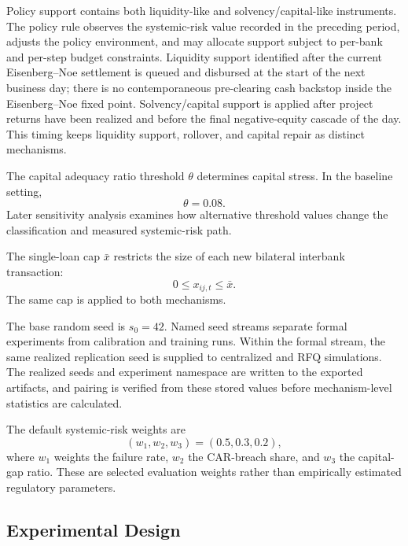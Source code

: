 Policy support contains both liquidity-like and solvency/capital-like
instruments. The policy rule observes the systemic-risk value recorded in
the preceding period, adjusts the policy environment, and may allocate
support subject to per-bank and per-step budget constraints. Liquidity
support identified after the current Eisenberg--Noe settlement is queued
and disbursed at the start of the next business day; there is no
contemporaneous pre-clearing cash backstop inside the Eisenberg--Noe fixed
point. Solvency/capital support is applied after project returns have been
realized and before the final negative-equity cascade of the day. This
timing keeps liquidity support, rollover, and capital repair as distinct
mechanisms.

The capital adequacy ratio threshold \(\theta\) determines capital
stress. In the baseline setting,
\begin{equation}
\theta=0.08.
\end{equation}
Later sensitivity analysis examines how alternative threshold values
change the classification and measured systemic-risk path.

The single-loan cap \(\bar{x}\) restricts the size of each new bilateral
interbank transaction:
\begin{equation}
0\leq x_{ij,t}\leq\bar{x}.
\label{eq:loan-cap}
\end{equation}
The same cap is applied to both mechanisms.

The base random seed is \(s_0=42\). Named seed streams separate formal
experiments from calibration and training runs. Within the formal stream,
the same realized replication seed is supplied to centralized and RFQ
simulations. The realized seeds and experiment namespace are written to
the exported artifacts, and pairing is verified from these stored values
before mechanism-level statistics are calculated.

The default systemic-risk weights are
\begin{equation}
\left(w_1,w_2,w_3\right)=\left(0.5,0.3,0.2\right),
\end{equation}
\vspace{-0.4\baselineskip}
\noindent
where \(w_1\) weights the failure rate, \(w_2\) the CAR-breach share,
and \(w_3\) the capital-gap ratio. These are selected evaluation weights
rather than empirically estimated regulatory parameters.

\subsection{Experimental Design}

